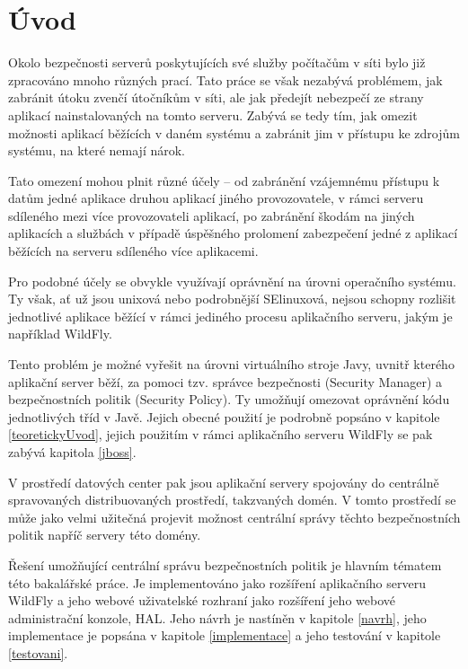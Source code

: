 
\chapter{Úvod} \label{uplnyUvod}

Okolo bezpečnosti serverů poskytujících své služby počítačům v síti bylo již zpracováno mnoho různých prací.
Tato práce se však nezabývá problémem, jak zabránit útoku zvenčí útočníkům v síti, ale jak předejít nebezpečí ze strany aplikací nainstalovaných na tomto serveru.
Zabývá se tedy tím, jak omezit možnosti aplikací běžících v daném systému a zabránit jim v přístupu ke zdrojům systému, na které nemají nárok.

Tato omezení mohou plnit různé účely -- od zabránění vzájemnému přístupu k datům jedné aplikace druhou aplikací jiného provozovatele,
v rámci serveru sdíleného mezi více provozovateli aplikací, po zabránění škodám na jiných aplikacích a službách v případě úspěšného prolomení
zabezpečení jedné z aplikací běžících na serveru sdíleného více aplikacemi.

Pro podobné účely se obvykle využívají oprávnění na úrovni operačního systému. Ty však, ať už jsou unixová nebo podrobnější SElinuxová,
nejsou schopny rozlišit jednotlivé aplikace běžící v rámci jediného procesu aplikačního serveru, jakým je například WildFly.

Tento problém je možné vyřešit na úrovni virtuálního stroje Javy, uvnitř kterého aplikační server běží, za pomoci tzv. správce bezpečnosti (Security Manager)
a bezpečnostních politik (Security Policy). Ty umožňují omezovat oprávnění kódu jednotlivých tříd v Javě.
Jejich obecné použití je podrobně popsáno v kapitole \ref{teoretickyUvod}, jejich použitím v rámci aplikačního serveru WildFly se pak zabývá kapitola \ref{jboss}.

V prostředí datových center pak jsou aplikační servery spojovány do centrálně spravovaných distribuovaných prostředí, takzvaných domén.
V tomto prostředí se může jako velmi užitečná projevit možnost centrální správy těchto bezpečnostních politik napříč servery této domény.

Řešení umožňující centrální správu bezpečnostních politik je hlavním tématem této bakalářské práce.
Je implementováno jako rozšíření aplikačního serveru WildFly a jeho webové uživatelské rozhraní jako rozšíření jeho webové administrační konzole, HAL.
Jeho návrh je nastíněn v kapitole \ref{navrh}, jeho implementace je popsána v kapitole \ref{implementace} a jeho testování v kapitole \ref{testovani}.

